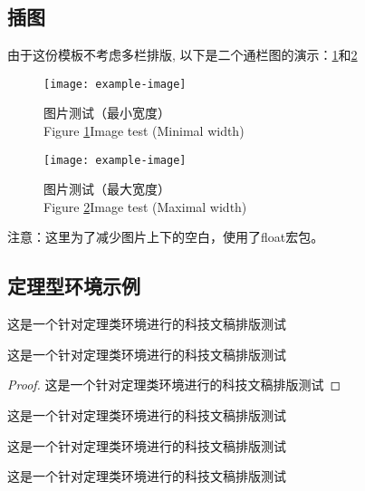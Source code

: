 \subsection{插图}
由于这份模板不考虑多栏排版, 以下是二个通栏图的演示：\cref{fig:1}和\cref{fig:2}
\begin{figure}[H]
	\centering
	\texttt{[image: example-image]}
	\caption{图片测试（最小宽度）\\Figure \ref{fig:1}\quad  Image test (Minimal width)\label{fig:1}}
\end{figure}

\begin{figure}[H]
	\centering
	\texttt{[image: example-image]}
	\caption{图片测试（最大宽度）\\Figure \ref{fig:2}\quad  Image test (Maximal width)\label{fig:2}}
\end{figure}

注意：这里为了减少图片上下的空白，使用了float宏包。


\newcommand{\bbb}{这是一个针对定理类环境进行的科技文稿排版测试}

\subsection{定理型环境示例}

\begin{definition} 
	这是一个针对定理类环境进行的科技文稿排版测试
\end{definition}

\begin{theorem}\label{th1}
	这是一个针对定理类环境进行的科技文稿排版测试
\end{theorem}

\begin{proof}
	这是一个针对定理类环境进行的科技文稿排版测试
\end{proof}

\begin{corollary}\label{cor1}
	这是一个针对定理类环境进行的科技文稿排版测试
\end{corollary}

\begin{lemma}\label{lem1}
	这是一个针对定理类环境进行的科技文稿排版测试
\end{lemma}

\begin{example}
	这是一个针对定理类环境进行的科技文稿排版测试
\end{example}

